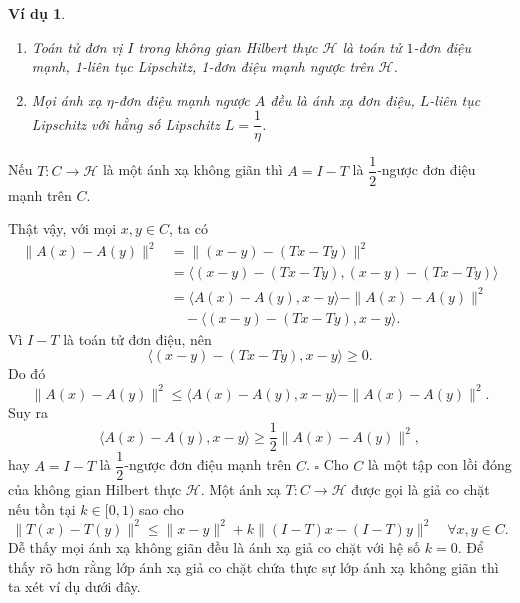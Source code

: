 \documentclass[14pt, oneside,A4paper]{book}
\theoremstyle{plain}
\newcommand{\eproof}{\hfill $\square$}
\newtheorem{vd}[theorem]{\bf Ví dụ}
\begin{document}
\begin{vd}\rm 
	\begin{enumerate}
		\item[(a)] Toán tử đơn vị $I$ trong không gian Hilbert thực $\mathcal H$ là toán tử $1$-đơn điệu mạnh, 1-liên tục Lipschitz, 1-đơn điệu mạnh ngược trên $\mathcal H$.
		
		\item[(b)] Mọi ánh xạ $\eta$-đơn điệu mạnh ngược $A$ đều là ánh xạ đơn điệu, $L$-liên tục Lipschitz với hằng số Lipschitz $L=\dfrac{1}{\eta}$. 
	\end{enumerate}
\end{vd}

\rm Nếu $T: C\longrightarrow \mathcal H$ là một ánh xạ không giãn thì $A=I-T$ là $\dfrac{1}{2}$-ngược đơn điệu mạnh trên $C$.

Thật vậy, với mọi $x,y\in C$, ta có
\begin{align*}
\|A(x)-A(y)\|^2&=\|(x-y)-(Tx-Ty)\|^2\\
&=\langle (x-y)-(Tx-Ty), (x-y)-(Tx-Ty)\rangle\\
&=\langle A(x)-A(y), x-y\rangle -\|A(x)-A(y)\|^2\\
&\quad -\langle (x-y)-(Tx-Ty), x-y\rangle.
\end{align*}
Vì $I-T$ là toán tử đơn điệu, nên
$$\langle (x-y)-(Tx-Ty), x-y\rangle\geq 0.$$
Do đó
$$\|A(x)-A(y)\|^2\leq \langle A(x)-A(y), x-y\rangle -\|A(x)-A(y)\|^2.$$
Suy ra
$$\langle A(x)-A(y), x-y\rangle\geq \dfrac{1}{2}\|A(x)-A(y)\|^2,$$
hay $A=I-T$ là $\dfrac{1}{2}$-ngược đơn điệu mạnh trên $C$.
\eproof
{}\rm Cho $C$ là một tập con lồi đóng của không gian Hilbert thực $\mathcal H$. Một ánh xạ $T: C\longrightarrow \mathcal H$ được gọi là giả co chặt nếu tồn tại $k\in [0,1)$ sao cho
\begin{equation}
\|T(x)-T(y)\|^2\leq \|x-y\|^2+k\|(I-T)x-(I-T)y\|^2\quad  \forall x,y\in C.
\end{equation}
Dễ thấy mọi ánh xạ không giãn đều là ánh xạ giả co chặt với hệ số $k=0$. Để thấy rõ hơn rằng lớp ánh xạ giả co chặt chứa thực sự lớp ánh xạ không giãn thì ta xét ví dụ dưới đây.
\end{document}
